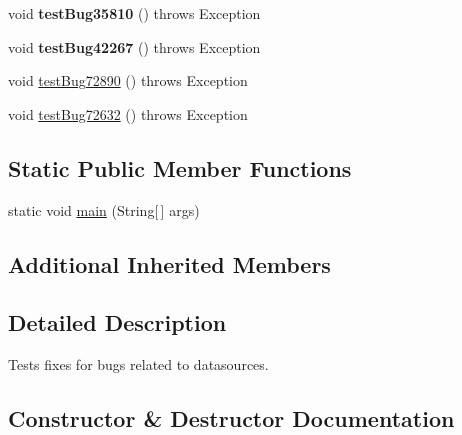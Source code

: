 \begin{DoxyCompactItemize}
void {\bfseries test\+Bug35810} ()  throws Exception 
\item 
\mbox{\label{classtestsuite_1_1regression_1_1_data_source_regression_test_a1245631ae5a6845eb5ddbb827815d8f4}} 
void {\bfseries test\+Bug42267} ()  throws Exception 
\item 
void \mbox{\hyperlink{classtestsuite_1_1regression_1_1_data_source_regression_test_ae91b4203179883e6c257ba0484c9974e}{test\+Bug72890}} ()  throws Exception 
\item 
void \mbox{\hyperlink{classtestsuite_1_1regression_1_1_data_source_regression_test_abba082ff766209732ff52f20bfe77cae}{test\+Bug72632}} ()  throws Exception 
\end{DoxyCompactItemize}
\subsection*{Static Public Member Functions}
\begin{DoxyCompactItemize}
\item 
static void \mbox{\hyperlink{classtestsuite_1_1regression_1_1_data_source_regression_test_a0d381bc3c72a7d395cb47e226208071d}{main}} (String\mbox{[}$\,$\mbox{]} args)
\end{DoxyCompactItemize}
\subsection*{Additional Inherited Members}


\subsection{Detailed Description}
Tests fixes for bugs related to datasources. 

\subsection{Constructor \& Destructor Documentation}
\mbox{\label{classtestsuite_1_1regression_1_1_data_source_regression_test_ab2c694d826548de54ca0b8397a78293c}} 
